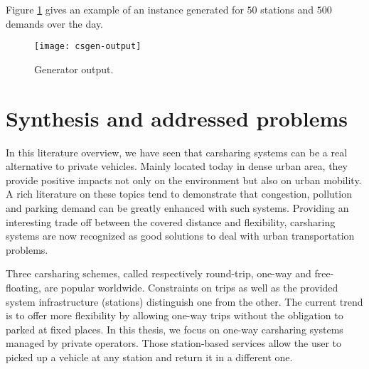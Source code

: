 \begin{bibunit}[ieeetr]
Figure \ref{fig:csgen-output} gives an example of an instance generated for $50$ stations and $500$ demands over the day.


\begin{figure}[!h]
\centering
\texttt{[image: csgen-output]}
\caption{Generator output.}
\label{fig:csgen-output}
\end{figure}






\section{Synthesis and addressed problems}

In this literature overview, we have seen that carsharing systems can be a real alternative to private vehicles.
Mainly located today in dense urban area, they provide positive impacts not only on the environment but also on urban mobility.
A rich literature on these topics tend to demonstrate that congestion, pollution and parking demand can be greatly enhanced with such systems.
Providing an interesting trade off between the covered distance and flexibility, carsharing systems are now recognized as good solutions to deal with urban transportation problems.

\medskip
Three carsharing schemes, called respectively round-trip, one-way and free-floating, are popular worldwide.
Constraints on trips as well as the provided system infrastructure (stations) distinguish one from the other.
The current trend is to offer more flexibility by allowing one-way trips without the obligation to parked at fixed places.
In this thesis, we focus on one-way carsharing systems managed by private operators.
Those station-based services allow the user to picked up a vehicle at any station and return it in a different one.



\end{bibunit}
